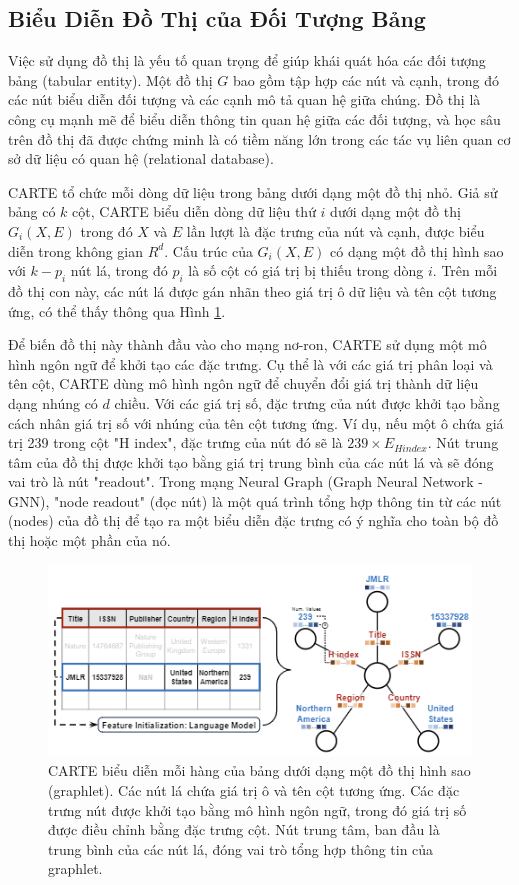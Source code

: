 \documentclass{article}
\begin{document}
\subsection{Biểu Diễn Đồ Thị của Đối Tượng Bảng} \label{sec:graph_representation}
Việc sử dụng đồ thị là yếu tố quan trọng để giúp khái quát hóa các đối tượng bảng (tabular entity). Một đồ thị $G$ bao gồm tập hợp các nút và cạnh, trong đó các nút biểu diễn đối tượng và các cạnh mô tả quan hệ giữa chúng. Đồ thị là công cụ mạnh mẽ để biểu diễn thông tin quan hệ giữa các đối tượng, và học sâu trên đồ thị đã được chứng minh là có tiềm năng lớn trong các tác vụ liên quan cơ sở dữ liệu có quan hệ (relational database).

CARTE tổ chức mỗi dòng dữ liệu trong bảng dưới dạng một đồ thị nhỏ. Giả sử bảng có $k$ cột, CARTE biểu diễn dòng dữ liệu thứ $i$ dưới dạng một đồ thị $G_i(X,E)$ trong đó $X$ và $E$ lần lượt là đặc trưng của nút và cạnh, được biểu diễn trong không gian $R^d$. Cấu trúc của $G_i(X,E)$ có dạng một đồ thị hình sao với $k-p_i$ nút lá, trong đó $p_i$ là số cột có giá trị bị thiếu trong dòng $i$. Trên mỗi đồ thị con này, các nút lá được gán nhãn theo giá trị ô dữ liệu và tên cột tương ứng, có thể thấy thông qua Hình \ref{fig:graphlet_representation_of_tabular_entity}.

Để biến đồ thị này thành đầu vào cho mạng nơ-ron, CARTE sử dụng một mô hình ngôn ngữ để khởi tạo các đặc trưng. Cụ thể là với các giá trị phân loại và tên cột, CARTE dùng mô hình ngôn ngữ để chuyển đổi giá trị thành dữ liệu dạng nhúng có $d$ chiều. Với các giá trị số, đặc trưng của nút được khởi tạo bằng cách nhân giá trị số với nhúng của tên cột tương ứng. Ví dụ, nếu một ô chứa giá trị 239 trong cột "H index", đặc trưng của nút đó sẽ là $239 \times E_{H index}$. Nút trung tâm của đồ thị được khởi tạo bằng giá trị trung bình của các nút lá và sẽ đóng vai trò là nút "readout". Trong mạng Neural Graph (Graph Neural Network - GNN), "node readout" (đọc nút) là một quá trình tổng hợp thông tin từ các nút (nodes) của đồ thị để tạo ra một biểu diễn đặc trưng có ý nghĩa cho toàn bộ đồ thị hoặc một phần của nó. 

\begin{figure} 
    \centering
    \includegraphics[scale = 1]{graphlet_representation_of_tabular_entity.png}
    \caption{CARTE biểu diễn mỗi hàng của bảng dưới dạng một đồ thị hình sao (graphlet). Các nút lá chứa giá trị ô và tên cột tương ứng. Các đặc trưng nút được khởi tạo bằng mô hình ngôn ngữ, trong đó giá trị số được điều chỉnh bằng đặc trưng cột. Nút trung tâm, ban đầu là trung bình của các nút lá, đóng vai trò tổng hợp thông tin của graphlet.}
    \label{fig:graphlet_representation_of_tabular_entity}
\end{figure}
\end{document}
